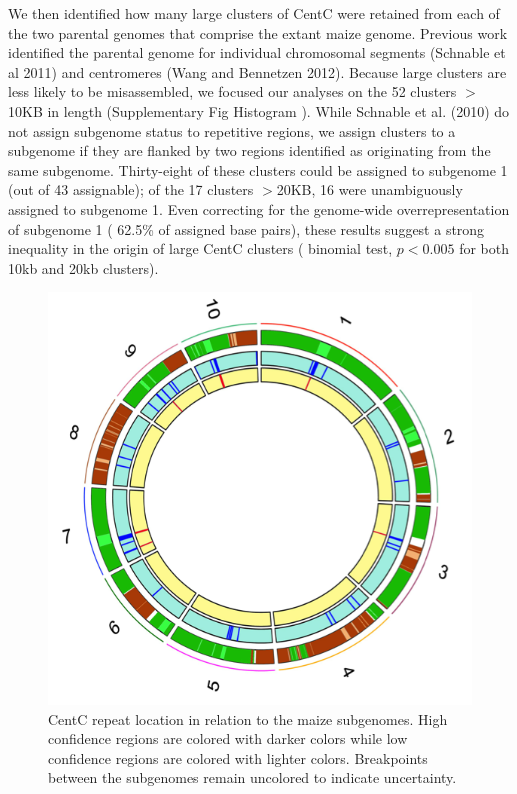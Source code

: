  We then identified how many large clusters of CentC were retained from each of the two parental genomes that comprise the extant maize genome.  Previous work identified the parental genome for individual chromosomal segments (Schnable et al 2011) and centromeres (Wang and Bennetzen 2012).  Because large clusters are less likely to be misassembled, we focused our analyses on the 52 clusters $>$10KB in length (Supplementary Fig Histogram ).  While Schnable et al. (2010) do not assign subgenome status to repetitive regions, we assign clusters to a subgenome if they are flanked by two regions identified as originating from the same  subgenome.  Thirty-eight of these clusters could be assigned to subgenome 1 (out of 43 assignable); of the 17 clusters $>$20KB, 16 were unambiguously assigned to subgenome 1.  Even correcting for the genome-wide overrepresentation of subgenome 1 ( 62.5\% of assigned base pairs), these results suggest a strong inequality in the origin of large CentC clusters ( binomial test, $p<0.005$ for both 10kb and 20kb clusters). 

\begin{figure}
  \includegraphics{circos.png}
\caption{CentC repeat location in relation to the maize subgenomes.  High confidence regions are colored with darker colors while low confidence regions are colored with lighter colors.  Breakpoints between the subgenomes remain uncolored to indicate uncertainty.}
\label{circos}    
\end{figure}

